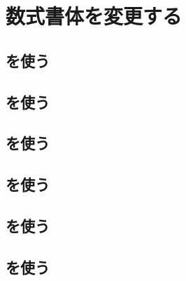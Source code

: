 \section{数式書体を変更する}

\subsection{を使う}
\begin{inonly}
\usepackage{tyep1cm}
\end{inonly}
\begin{outonly}
% 
\end{outonly}

\subsection{を使う}
\begin{inonly}
\usepackage{euler} 
\end{inonly}
\begin{outonly}
%
\end{outonly}

\clearpage

\subsection{を使う}
\begin{inonly}
\usepackage{mathpazo} 
\end{inonly}
\begin{outonly}
% 
\end{outonly}

\subsection{を使う}
\begin{inonly}
\usepackage{pxfonts}  
\end{inonly}
\begin{outonly}
% 
\end{outonly}

\clearpage

\subsection{を使う}
\begin{inonly}
\usepackage{mathptmx}  
\end{inonly}
\begin{outonly}
%
\end{outonly}

\subsection{を使う}
\begin{inonly}
\usepackage{txfonts}  
\end{inonly}
\begin{outonly}
% 
\end{outonly}


